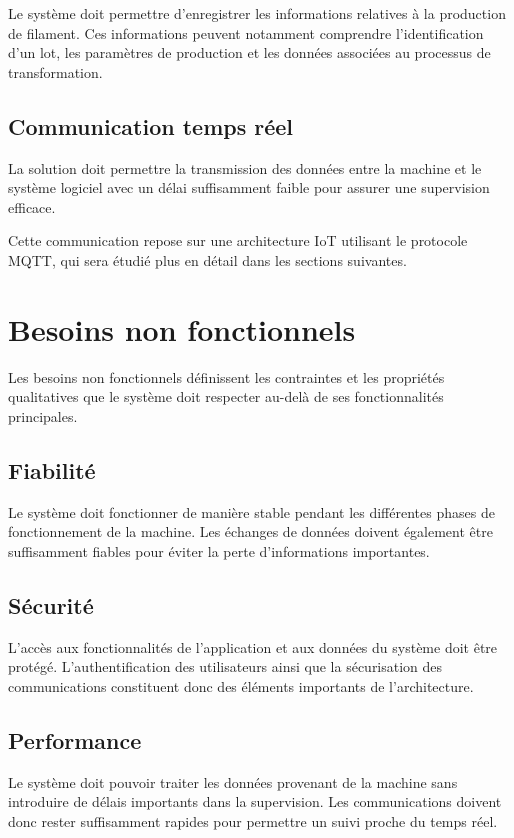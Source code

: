Le système doit permettre d'enregistrer les informations relatives à la
production de filament. Ces informations peuvent notamment comprendre
l'identification d'un lot, les paramètres de production et les données
associées au processus de transformation.

\subsection{Communication temps réel}

La solution doit permettre la transmission des données entre la machine et
le système logiciel avec un délai suffisamment faible pour assurer une
supervision efficace.

Cette communication repose sur une architecture IoT utilisant le protocole
MQTT, qui sera étudié plus en détail dans les sections suivantes.

\section{Besoins non fonctionnels}

Les besoins non fonctionnels définissent les contraintes et les propriétés
qualitatives que le système doit respecter au-delà de ses fonctionnalités
principales.

\subsection{Fiabilité}

Le système doit fonctionner de manière stable pendant les différentes
phases de fonctionnement de la machine. Les échanges de données doivent
également être suffisamment fiables pour éviter la perte d'informations
importantes.

\subsection{Sécurité}

L'accès aux fonctionnalités de l'application et aux données du système
doit être protégé. L'authentification des utilisateurs ainsi que la
sécurisation des communications constituent donc des éléments importants
de l'architecture.

\subsection{Performance}

Le système doit pouvoir traiter les données provenant de la machine sans
introduire de délais importants dans la supervision. Les communications
doivent donc rester suffisamment rapides pour permettre un suivi proche du
temps réel.

